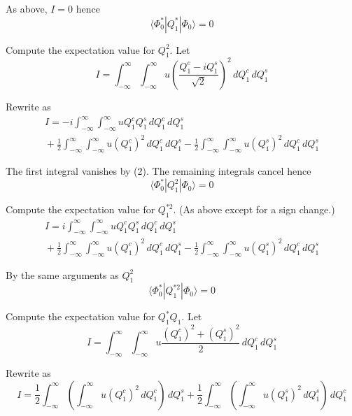 \documentclass[12pt]{article}
\begin{document}
As above, $I=0$ hence
\begin{equation*}
\langle\Phi_0^*|Q_1^*|\Phi_0\rangle=0
\end{equation*}

Compute the expectation value for $Q_1^2$.
Let
\begin{equation*}
I=\int_{-\infty}^\infty\int_{-\infty}^\infty
u\left(\frac{Q_1^c-iQ_1^s}{\sqrt2}\right)^2\,dQ_1^c\,dQ_1^s
\end{equation*}

Rewrite as
\begin{multline*}
I=-i\int_{-\infty}^\infty\int_{-\infty}^\infty
uQ_1^cQ_1^s\,dQ_1^c\,dQ_1^s
\\
{}+\frac{1}{2}
\int_{-\infty}^\infty\int_{-\infty}^\infty
u(Q_1^c)^2\,dQ_1^c\,dQ_1^s
-\frac{1}{2}
\int_{-\infty}^\infty\int_{-\infty}^\infty
u(Q_1^s)^2\,dQ_1^c\,dQ_1^s
\end{multline*}

The first integral vanishes by (2).
The remaining integrals cancel hence
\begin{equation*}
\langle\Phi_0^*|Q_1^2|\Phi_0\rangle=0
\end{equation*}

Compute the expectation value for $Q_1^{*2}$.
(As above except for a sign change.)
\begin{multline*}
I=i\int_{-\infty}^\infty\int_{-\infty}^\infty
uQ_1^cQ_1^s\,dQ_1^c\,dQ_1^s
\\
{}+\frac{1}{2}
\int_{-\infty}^\infty\int_{-\infty}^\infty
u(Q_1^c)^2\,dQ_1^c\,dQ_1^s
-\frac{1}{2}
\int_{-\infty}^\infty\int_{-\infty}^\infty
u(Q_1^s)^2\,dQ_1^c\,dQ_1^s
\end{multline*}

By the same arguments as $Q_1^2$
\begin{equation*}
\langle\Phi_0^*|Q_1^{*2}|\Phi_0\rangle=0
\end{equation*}

Compute the expectation value for $Q_1^*Q_1$.
Let
\begin{equation*}
I=\int_{-\infty}^\infty\int_{-\infty}^\infty
u\frac{(Q_1^c)^2+(Q_1^s)^2}{2}\,dQ_1^c\,dQ_1^s
\end{equation*}

Rewrite as
\begin{equation*}
I=\frac{1}{2}\int_{-\infty}^\infty\left(\int_{-\infty}^\infty u(Q_1^c)^2\,dQ_1^c\right)\,dQ_1^s
+\frac{1}{2}\int_{-\infty}^\infty\left(\int_{-\infty}^\infty u(Q_1^s)^2\,dQ_1^s\right)\,dQ_1^c
\end{equation*}
\end{document}
